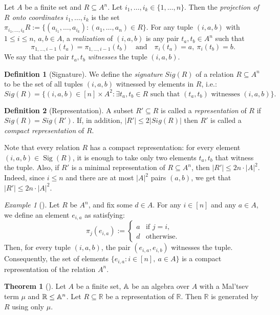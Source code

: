 \documentclass{article}
\newcommand{\A}{\ensuremath\mathbb{A}}
\newcommand{\R}{\mathbb{R}}
\theoremstyle{definition}
\newtheorem{df}{Definition}
\theoremstyle{theorem}
\newtheorem{thm}{Theorem}
\theoremstyle{theorem}
\theoremstyle{remark}
\theoremstyle{remark}
\theoremstyle{example}
\newtheorem{ex}{Example}
\theoremstyle{notation}
\theoremstyle{theorem}
\begin{document}
Let $A$ be a finite set and $R \subseteq A^n$. Let $i_1, \ldots, i_k \in \{1, \ldots, n\}$. Then the \emph{projection of $R$ onto coordinates $i_1, \ldots, i_k$} is the set 
$\pi_{i_1, \ldots, i_k} R := \{(a_{i_1}, \ldots, a_{i_k}) : (a_1, \ldots, a_n) \in R\}$. For any tuple $(i,a,b)$ with $1 \leq i \leq n$, $a,b \in A$, a \emph{realization} of $(i,a,b)$ is any pair $t_a, t_b \in A^n$ such that 
$$
\pi_{1,\ldots,i-1}(t_a) = \pi_{1,\ldots,i-1}(t_b) \quad \text{and} \quad \pi_i(t_a) = a,\ \pi_i(t_b) = b.
$$
We say that the pair $t_a, t_b$ \emph{witnesses} the tuple $(i,a,b)$.

\begin{df}[Signature]\label{askdjfh;lkasf}
    We define the \emph{signature} $Sig(R)$ of a relation $R\subseteq A^n$ to be the set of all tuples $(i,a,b)$ witnessed by elements in $R$, i.e.:
    $$Sig(R)=\{(i,a,b)\in [n]\times A^2:\exists t_a,t_b\in R \text{ such that }(t_a,t_b)\text{ witnesses }(i,a,b)\}.
    $$
\end{df}

\begin{df}[Representation]
A subset $R'\subseteq R$ is called a \emph{representation} of $R$ if $Sig(R)=Sig(R')$. If, in addition,
$|R'|\leq 2|Sig(R)|$ then $R'$ is called a \emph{compact representation} of $R$. 
\end{df}

Note that every relation $R$ has a compact representation: for every element $(i,a,b) \in \operatorname{Sig}(R)$, it is enough to take only two elements $t_a, t_b$ that witness the tuple. Also, if $R'$ is a minimal representation of $R \subseteq A^n$, then $|R'| \leq 2n \cdot |A|^2$. Indeed, since $i \leq n$ and there are at most $|A|^2$ pairs $(a,b)$, we get that $|R'| \leq 2n \cdot |A|^2$. 


\begin{ex}[\cite{doi:10.1137/050628957}]\label{alksdj;asjfegh}
    Let $R$ be $A^n$, and fix some $d \in A$. For any $i \in [n]$ and any $a \in A$, we define an element $e_{i,a}$ as satisfying:
$$
\pi_j(e_{i,a}) := \begin{cases}
a & \text{if } j=i, \\
d & \text{otherwise}.
\end{cases}
$$
Then, for every tuple $(i,a,b)$, the pair $(e_{i,a}, e_{i,b})$ witnesses the tuple. Consequently, the set of elements $\{e_{i,a} : i \in [n],\ a \in A\}$ is a compact representation of the relation $A^n$. 
\end{ex}


\begin{thm}[\cite{doi:10.1137/050628957}]\label{alalksdjasd}
Let $A$ be a finite set, $\A$ be an algebra over $A$ with a Mal'tsev term $\mu$ and $\R \leq \A^n$. Let $R \subseteq \R$ be a representation of $\R$. Then $\R$ is generated by $R$ using only $\mu$. 
\end{thm}
\end{document}

